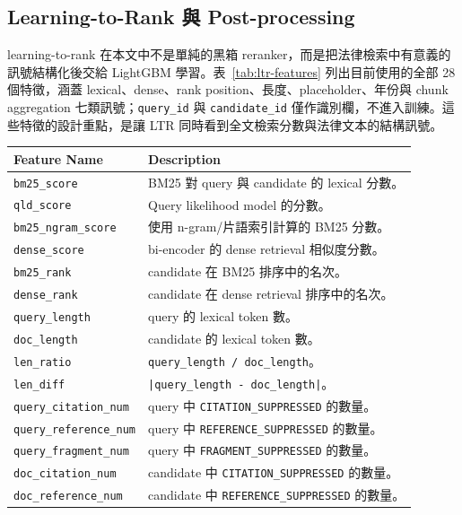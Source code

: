 \subsection{Learning-to-Rank 與 Post-processing}

learning-to-rank 在本文中不是單純的黑箱 reranker，而是把法律檢索中有意義的訊號結構化後交給 LightGBM 學習。表~\ref{tab:ltr-features} 列出目前使用的全部 28 個特徵，涵蓋 lexical、dense、rank position、長度、placeholder、年份與 chunk aggregation 七類訊號；\texttt{query\_id} 與 \texttt{candidate\_id} 僅作識別欄，不進入訓練。這些特徵的設計重點，是讓 LTR 同時看到全文檢索分數與法律文本的結構訊號。

\begin{table}[t]
  \centering
  \scriptsize
  \begin{tabular}{lp{}}
    \toprule
    Feature Name & Description \\
    \midrule
    \texttt{bm25\_score} & BM25 對 query 與 candidate 的 lexical 分數。 \\
    \texttt{qld\_score} & Query likelihood model 的分數。 \\
    \texttt{bm25\_ngram\_score} & 使用 n-gram/片語索引計算的 BM25 分數。 \\
    \texttt{dense\_score} & bi-encoder 的 dense retrieval 相似度分數。 \\
    \texttt{bm25\_rank} & candidate 在 BM25 排序中的名次。 \\
    \texttt{dense\_rank} & candidate 在 dense retrieval 排序中的名次。 \\
    \texttt{query\_length} & query 的 lexical token 數。 \\
    \texttt{doc\_length} & candidate 的 lexical token 數。 \\
    \texttt{len\_ratio} & \texttt{query\_length / doc\_length}。 \\
    \texttt{len\_diff} & \texttt{|query\_length - doc\_length|}。 \\
    \texttt{query\_citation\_num} & query 中 \texttt{CITATION\_SUPPRESSED} 的數量。 \\
    \texttt{query\_reference\_num} & query 中 \texttt{REFERENCE\_SUPPRESSED} 的數量。 \\
    \texttt{query\_fragment\_num} & query 中 \texttt{FRAGMENT\_SUPPRESSED} 的數量。 \\
    \texttt{doc\_citation\_num} & candidate 中 \texttt{CITATION\_SUPPRESSED} 的數量。 \\
    \texttt{doc\_reference\_num} & candidate 中 \texttt{REFERENCE\_SUPPRESSED} 的數量。 \\

\end{tabular}
\end{table}
